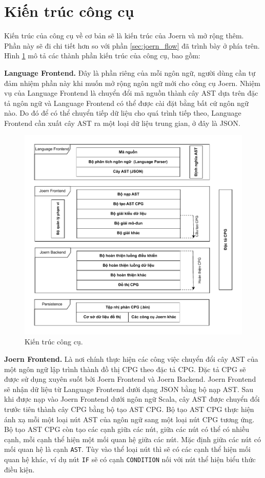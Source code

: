 \section{Kiến trúc công cụ}
\label{chapter:arch}

Kiến trúc của công cụ về cơ bản sẽ là kiến trúc của Joern và mở rộng thêm.
Phần này sẽ đi chi tiết hơn so với phần \ref{sec:joern_flow} đã trình bày ở phía trên.
Hình \ref{img:c3_arch} mô tả các thành phần kiến trúc của công cụ, bao gồm:

\textbf{Language Frontend.} Đây là phần riêng của mỗi ngôn ngữ, người dùng cần tự đảm nhiệm phần này khi muốn mở rộng ngôn ngữ mới cho công cụ Joern.
Nhiệm vụ của Language Frontend là chuyển đổi mã nguồn thành cây AST dựa trên đặc tả ngôn ngữ và Language Frontend có thể được cài đặt bằng bất cứ ngôn ngữ nào.
Do đó để có thể chuyển tiếp dữ liệu cho quá trình tiếp theo, Language Frontend cần xuất cây AST ra một loại dữ liệu trung gian, ở đây là JSON.

\begin{figure}[H]
	\includegraphics[width=1\columnwidth]{figures/c3/c3_arch.drawio.pdf}
	\centering
	\caption{Kiến trúc công cụ.}
	\label{img:c3_arch}
\end{figure}

\textbf{Joern Frontend.} Là nơi chính thực hiện các công việc chuyển đổi cây AST của một ngôn ngữ lập trình thành đồ thị CPG theo đặc tả CPG.
Đặc tả CPG sẽ được sử dụng xuyên suốt bởi Joern Frontend và Joern Backend.
Joern Frontend sẽ nhận dữ liệu từ Language Frontend dưới dạng JSON bằng bộ nạp AST.
Sau khi được nạp vào Joern Frontend dưới ngôn ngữ Scala, cây AST được chuyển đổi trước tiên thành cây CPG bằng bộ tạo AST CPG.
Bộ tạo AST CPG thực hiện ánh xạ mỗi một loại nút AST của ngôn ngữ sang một loại nút CPG tương ứng.
Bộ tạo AST CPG còn tạo các cạnh giữa các nút, giữa các nút có thể có nhiều cạnh, mỗi cạnh thể hiện một mối quan hệ giữa các nút.
Mặc định giữa các nút có mối quan hệ là cạnh \texttt{AST}.
Tùy vào thể loại nút thì sẽ có các cạnh thể hiện mối quan hệ khác, ví dụ nút \texttt{IF} sẽ có cạnh \texttt{CONDITION} nối với nút thể hiện biểu thức điều kiện.

